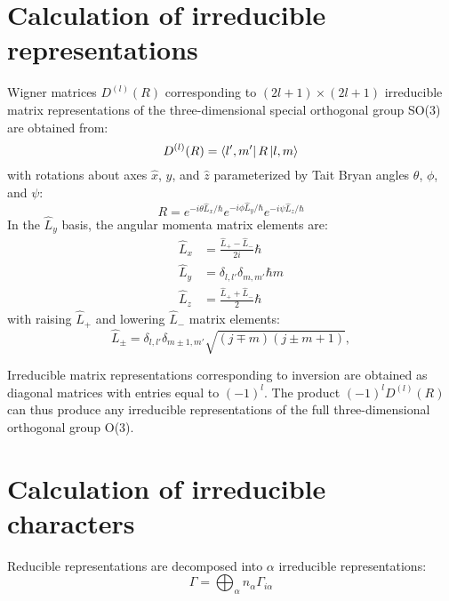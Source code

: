 \documentclass[preprint,showpacs,preprintnumbers,superscriptaddress,prb,floatfix,aps]{revtex4-1}
\begin{document}
\section{Calculation of irreducible representations}
Wigner matrices $D^{(l)}(R)$ corresponding to $(2l+1)\times(2l+1)$ irreducible matrix representations of the three-dimensional special orthogonal group SO(3) are obtained from:\cite{martin_electronic_2004}
\begin{equation}
\label{eq:imselfenergy}
D^{(l)}(R) = \bra{l',m'} R \ket{l,m}
\end{equation}
with rotations about axes $\hat{x}$, $\hat{y}$, and $\hat{z}$ parameterized by Tait Bryan angles $\theta$, $\phi$, and $\psi$:
\begin{equation}
R = e^{-i\theta\hat{L}_x/\hbar} e^{-i\phi\hat{L}_y/\hbar} e^{-i\psi\hat{L}_z/\hbar}
\end{equation}
%
In the $\hat{L}_y$ basis, the angular momenta matrix elements are:\cite{shankar_fundamentals_2014}
\begin{align}
\label{eq:angular_momenta}
\hat{L}_x & = \frac{\hat{L}_{+}-\hat{L}_{-}}{2i} \hbar \\
\hat{L}_y & = \delta_{l,l'}\delta_{m,m'} \hbar m \\
\hat{L}_z & = \frac{\hat{L}_{+}+\hat{L}_{-}}{2} \hbar
\end{align}
with raising $\hat{L}_+$ and lowering $\hat{L}_-$ matrix elements:
\begin{equation}
\label{eq:raising_lowering_operator}
\hat{L}_{\pm} = \delta_{l,l'}\delta_{m\pm1,m'} \sqrt{(j\mp m)(j\pm m+1)} ,
\end{equation}


Irreducible matrix representations corresponding to inversion are obtained as diagonal matrices with entries equal to $(-1)^l$. The product $(-1)^{l} D^{(l)}(R)$  can thus produce any irreducible representations of the full three-dimensional orthogonal group O(3).\cite{sharma_general_1979,el-batanouny_symmetry_2008} %



%
%
%
\section{Calculation of irreducible characters}
Reducible representations are decomposed into $\alpha$ irreducible representations:
\begin{equation}
\label{eq:irrep_decomposition}
\Gamma = \bigoplus_\alpha n_\alpha \Gamma_{i\alpha}
\end{equation}
\end{document}
